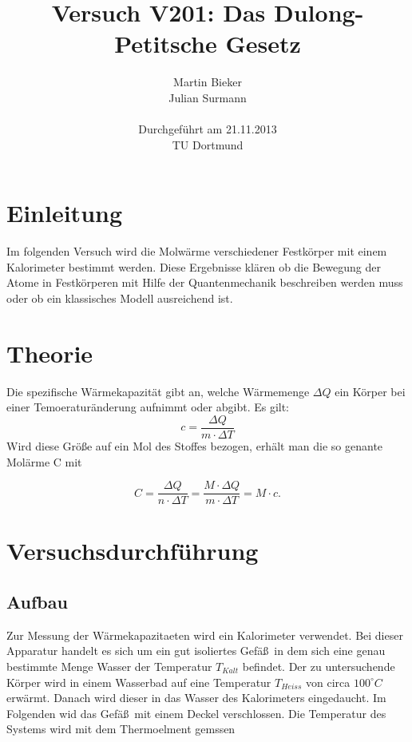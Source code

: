 \documentclass[11pt,ngerman,a4paper]{article}
\title{\textbf{Versuch V201: Das Dulong-Petitsche Gesetz}}
\author{Martin Bieker\\
		Julian Surmann\\
		\\
		Durchgef\"{u}hrt am 21.11.2013\\
		TU Dortmund}
\date{}
\begin{document}
\renewcommand\tablename{Tabelle}
\renewcommand\figurename{Abbildung}
\maketitle
\thispagestyle{empty}
\newpage
\clearpage
\setcounter{page}{1}


\section{Einleitung}

Im folgenden Versuch wird die Molw\"arme verschiedener Festk\"orper mit einem Kalorimeter bestimmt werden.  Diese Ergebnisse kl\"aren ob die Bewegung der Atome in Festk\"orperen mit Hilfe der Quantenmechanik beschreiben werden muss oder ob ein klassisches Modell ausreichend ist.
\section{Theorie}

Die spezifische W\"armekapazit\"at gibt an, welche W\"armemenge $\Delta Q$ ein K\"orper bei einer Temoeratur\"anderung aufnimmt oder abgibt. Es gilt:
\begin{equation}
c = \frac{\Delta Q}{m \cdot\Delta T}
\end{equation}
Wird diese Gr\"o\ss e auf ein Mol des Stoffes bezogen, erh\"alt man die so genante Mol\"arme C mit 

\begin{equation}
C = \frac{\Delta Q }{n\cdot \Delta T} =\frac{M\cdot \Delta Q}{m\cdot \Delta T} = M  \cdot c.
\end{equation}
\subsection{}
\section{Versuchsdurchf\"uhrung}

\subsection{Aufbau}
Zur Messung der W\"armekapazitaeten wird ein Kalorimeter verwendet. 
Bei dieser Apparatur handelt es sich um ein gut isoliertes Gef\"a\ss\ in dem sich eine genau bestimmte Menge Wasser der Temperatur $T_{Kalt}$ befindet. Der zu untersuchende K\"orper wird in einem Wasserbad auf eine Temperatur $T_{Heiss}$ von circa $100 ^\circ C$ erw\"armt. Danach wird dieser in das Wasser des Kalorimeters eingedaucht. Im Folgenden wid das Gef\"a\ss\ mit einem Deckel verschlossen. Die Temperatur des Systems wird mit dem Thermoelment gemssen
\end{document}
